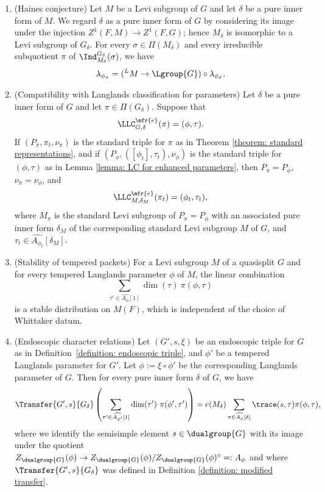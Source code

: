 \documentclass[11pt,letterpaper]{amsart}
\numberwithin{equation}{section}
\begin{document}
\begin{desideratum}
\begin{enumerate}
\item [\Hai] (Haines conjecture)
Let $M$ be a Levi subgroup of $G$ and let $\delta$ be a pure inner form of $M$. We regard $\delta$ as a pure inner form of $G$ by considering its image under the injection $Z^1(F,M) \to Z^1(F,G)$; hence $M_{\delta}$ is isomorphic to a Levi subgroup of $G_{\delta}$. For every $\sigma \in \Pi(M_{\delta})$ and every irreducible subquotient $\pi$ of $\Ind_{M_{\delta}}^{G_{\delta}} (\sigma)$, we have 
\[ \lambda_{\phi_{\pi}}= ({}^LM \to \Lgroup{G}) \circ \lambda_{\phi_{\sigma}}.\]
 \item [\LC] (Compatibility with Langlands classification for parameters) 
    Let $\delta$ be a pure inner form of $G$ and let $\pi \in \Pi(G_{\delta})$.
    Suppose that
    \[
    \LLC^{\mfr{e}}_{G,{\delta}}(\pi)= (\phi, \tau).
    \]
    If $(P_{\pi}, \pi_t, \nu_{\pi})$ is the standard triple for $\pi$ as in 
    Theorem \ref{theorem: standard representations}, and if
     $(P_{\phi}, ([ \phi_t], \tau_t), \nu_{\phi})$ is the standard triple for $(\phi, \tau)$ as in Lemma \ref{lemma: LC for enhanced parameters},
    then $P_\pi= P_\phi$,  $\nu_\pi = \nu_\phi$,
and    \[
    \LLC^{\mfr{e}}_{M,{\delta_M}}( \pi_t)=(\phi_t,\tau_t),
    \]
    where $M_{\pi}$ is the standard Levi subgroup of $P_\pi=P_\phi$ with an associated pure inner form $\delta_M$ of the corresponding standard Levi subgroup $M$ of $G$, and
    $\tau_t \in \widehat{A_{\phi_t}}[\delta_M]$.
    
    \item [\Sta] 
    (Stability of tempered packets) 
   For a Levi subgroup $M$ of a quasisplit $G$ and for every tempered Langlands parameter $\phi$ of $M$, the linear combination
    \[  
    \sum_{
    \tau' \in \widehat{A_{\phi}}[1]
    } 
    \dim(\tau)\ \pi(\phi,\tau)
    \]
    is a stable distribution on $M(F)$, which is independent of the choice of Whittaker datum.
    \item [\ECR] 
    (Endoscopic character relations)
    Let  $(G',s,\xi)$ be an endoscopic triple for $G$ as in Definition~\ref{definition: endoscopic triple}, and $\phi'$ be a tempered Langlands parameter for $G'$. Let $\phi:= \xi \circ \phi'$ be the corresponding Langlands parameter of $G$. Then for every pure inner form $\delta $ of $G$, we have
    \[
    \Transfer{G',s}{G_{\delta}} 
    \left( 
\sum_{
    \tau' \in \widehat{A_{\phi'}}[1]
    } 
    \dim(\tau')\ \pi(\phi',\tau')
\right)
    =  e(M_\delta)
    \sum_{\tau \in \widehat{A_{\phi}}[\delta]} \trace(s ,  \tau)  \pi(\phi, \tau),
    \]
    where we identify the semisimple element $s\in \dualgroup{G}$ with its image under the quotient $Z_{\dualgroup{G}}(\phi) \to Z_{\dualgroup{G}}(\phi)/Z_{\dualgroup{G}}(\phi)^\circ =: A_\phi$ and where $\Transfer{G',s}{G_\delta}$ was defined in Definition \ref{definition: modified transfer}.
    

\end{enumerate}
\end{desideratum}
\end{document}
